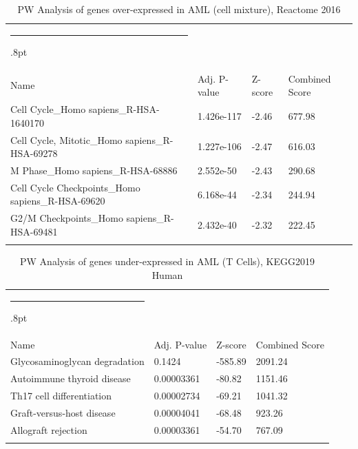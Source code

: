 \documentclass[3p,authoryear,preprint,12pt]{elsarticle}
\makeatletter
\def\hlinewd#1{%
  \noalign{\ifnum0=`}\fi\hrule \@height #1%
  \futurelet\reserved@a\@xhline}
\def\tbltoprule{\hlinewd{.8pt}\\[-12pt]}
\def\tblbottomrule{\noalign{\vspace*{6pt}}\hline\noalign{\vspace*{2pt}}}
\def\tblmidrule{\noalign{\vspace*{6pt}}\hline\noalign{\vspace*{2pt}}}
\makeatother
\begin{document}
\begin{table}[!htbp]
	\caption{{PW Analysis of genes over-expressed in AML (cell mixture), Reactome 2016} }
	\label{tw-de478ae31cq6}
	\def\arraystretch{1}
	\ignorespaces 
	\centering 
	\begin{tabulary}{\linewidth}{p{\dimexpr.65\tabcolsep}p{\dimexpr.15\tabcolsep}p{\dimexpr.1\tabcolsep}p{\dimexpr.1\tabcolsep}}
		\tbltoprule Name & Adj. P-value & Z-score & Combined Score\\
		\tblmidrule
Cell Cycle\_Homo sapiens\_R-HSA-1640170 & 1.426e-117 & -2.46 & 677.98 \\
Cell Cycle, Mitotic\_Homo sapiens\_R-HSA-69278 & 1.227e-106 & -2.47 & 616.03 \\
M Phase\_Homo sapiens\_R-HSA-68886 & 2.552e-50 & -2.43 & 290.68 \\
Cell Cycle Checkpoints\_Homo sapiens\_R-HSA-69620 & 6.168e-44 & -2.34 & 244.94 \\
G2/M Checkpoints\_Homo sapiens\_R-HSA-69481 & 2.432e-40 & -2.32 & 222.45 \\
		\tblbottomrule
	\end{tabulary}\par 
\end{table}
\begin{table}[!htbp]
	\caption{{PW Analysis of genes under-expressed in AML (T Cells), KEGG2019 Human} }
	\label{tw-de478ae31cr6}
	\def\arraystretch{1}
	\ignorespaces 
	\centering 
	\begin{tabulary}{\linewidth}{p{\dimexpr.65\tabcolsep}p{\dimexpr.15\tabcolsep}p{\dimexpr.1\tabcolsep}p{\dimexpr.1\tabcolsep}}
		\tbltoprule Name & Adj. P-value & Z-score & Combined Score\\
		\tblmidrule
Glycosaminoglycan degradation & 0.1424 & -585.89 & 2091.24 \\
Autoimmune thyroid disease & 0.00003361 & -80.82 & 1151.46 \\
Th17 cell differentiation & 0.00002734 & -69.21 & 1041.32 \\
Graft-versus-host disease & 0.00004041 & -68.48 & 923.26 \\
Allograft rejection & 0.00003361 & -54.70 & 767.09 \\
		\tblbottomrule
	\end{tabulary}\par 
\end{table}
\end{document}
